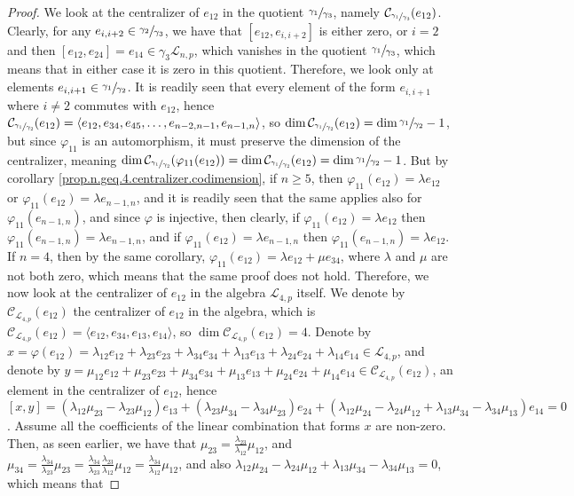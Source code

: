\documentclass[12pt]{article}
\begin{document}
\begin{proof}
We look at the centralizer of $e_{12}$ in the quotient $\sfrac{\gamma_1}{\gamma_3}$, namely $\mathcal{C}_{\sfrac{\gamma_1}{\gamma_3}}(e_{12})$. Clearly, for any $e_{i,i+2}\in\sfrac{\gamma_2}{\gamma_3}$, we have that $[e_{12},e_{i,i+2}]$ is either zero, or $i=2$ and then $[e_{12},e_{24}]=e_{14}\in\gamma_3\mathcal{L}_{n,p}$, which vanishes in the quotient $\sfrac{\gamma_1}{\gamma_3}$, which means that in either case it is zero in this quotient. Therefore, we look only at elements $e_{i,i+1}\in\sfrac{\gamma_1}{\gamma_2}$. It is readily seen that every element of the form $e_{i,i+1}$ where $i\neq 2$ commutes with $e_{12}$, hence $\mathcal{C}_{\sfrac{\gamma_1}{\gamma_2}}(e_{12})=\langle e_{12},e_{34},e_{45},\dots,e_{n-2,n-1},e_{n-1,n}\rangle$, so $\dim\mathcal{C}_{\sfrac{\gamma_1}{\gamma_2}}(e_{12})=\dim\sfrac{\gamma_1}{\gamma_2}-1$, but since $\varphi_{11}$ is an automorphism, it must preserve the dimension of the centralizer, meaning $\dim\mathcal{C}_{\sfrac{\gamma_1}{\gamma_2}}(\varphi_{11}(e_{12}))=\dim\mathcal{C}_{\sfrac{\gamma_1}{\gamma_2}}(e_{12})=\dim\sfrac{\gamma_1}{\gamma_2}-1$. But by corollary \ref{prop.n.geq.4.centralizer.codimension}, if $n\geq 5$, then $\varphi_{11}(e_{12})=\lambda e_{12}$ or $\varphi_{11}(e_{12})=\lambda e_{n-1,n}$, and it is readily seen that the same applies also for $\varphi_{11}(e_{n-1,n})$, and since $\varphi$ is injective, then clearly, if $\varphi_{11}(e_{12})=\lambda e_{12}$ then $\varphi_{11}(e_{n-1,n})=\lambda e_{n-1,n}$, and if $\varphi_{11}(e_{12})=\lambda e_{n-1,n}$ then $\varphi_{11}(e_{n-1,n})=\lambda e_{12}$. If $n=4$, then by the same corollary, $\varphi_{11}(e_{12})=\lambda e_{12}+\mu e_{34}$, where $\lambda$ and $\mu$ are not both zero, which means that the same proof does not hold. Therefore, we now look at the centralizer of $e_{12}$ in the algebra $\mathcal{L}_{4,p}$ itself. We denote by $\mathcal{C}_{\mathcal{L}_{4,p}}(e_{12})$ the centralizer of $e_{12}$ in the algebra, which is $\mathcal{C}_{\mathcal{L}_{4,p}}(e_{12})=\langle e_{12},e_{34},e_{13},e_{14}\rangle$, so $\dim\mathcal{C}_{\mathcal{L}_{4,p}}(e_{12})=4$. Denote by $x=\varphi(e_{12})=\lambda_{12}e_{12}+\lambda_{23}e_{23}+\lambda_{34}e_{34}+\lambda_{13}e_{13}+\lambda_{24}e_{24}+\lambda_{14}e_{14}\in\mathcal{L}_{4,p}$, and denote by $y=\mu_{12}e_{12}+\mu_{23}e_{23}+\mu_{34}e_{34}+\mu_{13}e_{13}+\mu_{24}e_{24}+\mu_{14}e_{14}\in\mathcal{C}_{\mathcal{L}_{4,p}}(e_{12})$, an element in the centralizer of $e_{12}$, hence $[x,y]=(\lambda_{12}\mu_{23}-\lambda_{23}\mu_{12})e_{13}+(\lambda_{23}\mu_{34}-\lambda_{34}\mu_{23})e_{24}+(\lambda_{12}\mu_{24}-\lambda_{24}\mu_{12}+\lambda_{13}\mu_{34}-\lambda_{34}\mu_{13})e_{14}=0$. Assume all the coefficients of the linear combination that forms $x$ are non-zero. Then, as seen earlier, we have that $\mu_{23}=\frac{\lambda_{23}}{\lambda_{12}}\mu_{12}$, and $\mu_{34}=\frac{\lambda_{34}}{\lambda_{23}}\mu_{23}=\frac{\lambda_{34}}{\lambda_{23}}\frac{\lambda_{23}}{\lambda_{12}}\mu_{12}=\frac{\lambda_{34}}{\lambda_{12}}\mu_{12}$, and also $\lambda_{12}\mu_{24}-\lambda_{24}\mu_{12}+\lambda_{13}\mu_{34}-\lambda_{34}\mu_{13}=0$, which means that 
\end{proof}
\end{document}
